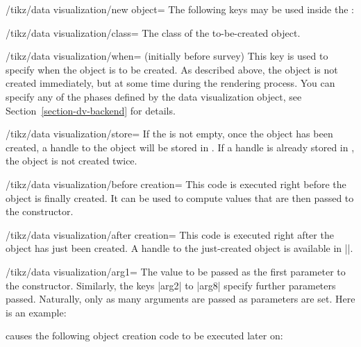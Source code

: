 \begin{key}{/tikz/data visualization/new object=}
    The following keys may be used inside the :
    \begin{key}{/tikz/data visualization/class=}
        The class of the to-be-created object.
    \end{key}
    \begin{key}{/tikz/data visualization/when= (initially before survey)}
        This key is used to specify when the object is to be created. As
        described above, the object is not created immediately, but at some
        time during the rendering process. You can specify any of the phases
        defined by the data visualization object, see
        Section~\ref{section-dv-backend} for details.
    \end{key}
    \begin{key}{/tikz/data visualization/store=}
        If the  is not empty, once the object has been created,
        a handle to the object will be stored in . If a handle
        is already stored in , the object is not created twice.
    \end{key}
    \begin{key}{/tikz/data visualization/before creation=}
        This code is executed right before the object is finally created. It
        can be used to compute values that are then passed to the constructor.
    \end{key}
    \begin{key}{/tikz/data visualization/after creation=}
        This code is executed right after the object has just been created. A
        handle to the just-created object is available in |\tikzdvobj|.
    \end{key}
    \begin{key}{/tikz/data visualization/arg1=}
        The value to be passed as the first parameter to the constructor.
        Similarly, the keys |arg2| to |arg8| specify further parameters passed.
        Naturally, only as many arguments are passed as parameters are set.
        Here is an example:
\begin{codeexample}
\end{codeexample}
        causes the following object creation code to be executed later on:
\begin{codeexample}

\end{codeexample}
\end{key}
\end{key}
